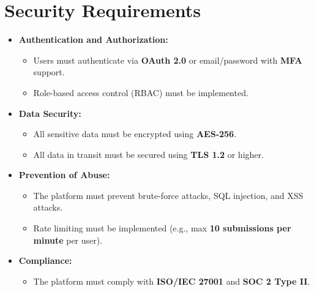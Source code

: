 \documentclass[a4paper, 11pt]{scrreprt}
\begin{document}
\section{Security Requirements}
\begin{itemize}
    \item \textbf{Authentication and Authorization:}
    \begin{itemize}
        \item Users must authenticate via \textbf{OAuth 2.0} or email/password with \textbf{MFA} support.
        \item Role-based access control (RBAC) must be implemented.
    \end{itemize}

    \item \textbf{Data Security:}
    \begin{itemize}
        \item All sensitive data must be encrypted using \textbf{AES-256}.
        \item All data in transit must be secured using \textbf{TLS 1.2} or higher.
    \end{itemize}

    \item \textbf{Prevention of Abuse:}
    \begin{itemize}
        \item The platform must prevent brute-force attacks, SQL injection, and XSS attacks.
        \item Rate limiting must be implemented (e.g., max \textbf{10 submissions per minute} per user).
    \end{itemize}

    \item \textbf{Compliance:}
    \begin{itemize}
        \item The platform must comply with \textbf{ISO/IEC 27001} and \textbf{SOC 2 Type II}.
    \end{itemize}
\end{itemize}
\end{document}
